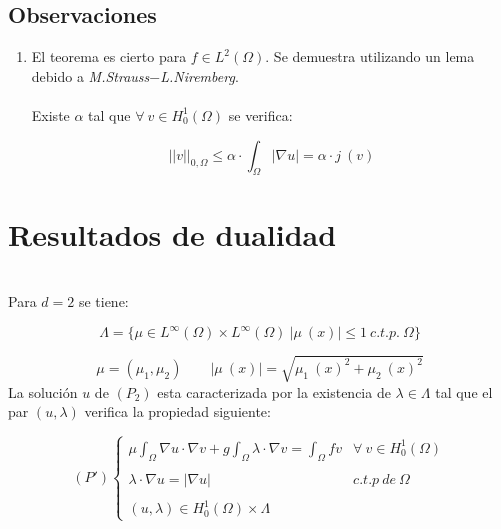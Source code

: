 \subsection{Observaciones}

\begin{enumerate}
\item El teorema es cierto para $f\in L^2(\Omega )$. Se demuestra utilizando un
lema debido a \emph{M.Strauss$-$L.Niremberg}.\\ \\
Existe $\alpha $ tal que $\forall \ v \in H^1_0(\Omega )$ se verifica:

\begin{displaymath}
||v||_{0,\Omega }\le \alpha \cdot \int_{\Omega } |\nabla u| = \alpha \cdot
j\ (v)
\end{displaymath}
\end{enumerate}

\newpage

\section{Resultados de dualidad}

\begin{teorema}
\ \\
Para $d=2$ se tiene:

\begin{displaymath}
\Lambda = \{\mu \in L^{\infty}(\Omega)\times L^{\infty}(\Omega )\ |\mu \ (x)|
\le 1\ c.t.p.\ \Omega \}
\end{displaymath}

\begin{displaymath}
\mu = (\mu_1,\mu_2)\qquad |\mu \ (x)| = \sqrt{\mu_1\ (x)^2+\mu_2\ (x)^2 }
\end{displaymath}
La soluci\'on $u$ de $(P_2)$ esta caracterizada por la existencia de
$\lambda \in \Lambda$ tal que el par $(u,\lambda )$ verifica la propiedad
siguiente:

\begin{displaymath}
(P') \left\{ \begin{array}{lr}
\mu \int_{\Omega } \nabla u \cdot \nabla v + g 
\int_{\Omega }  \lambda \cdot \nabla v = \int_{\Omega } fv & \forall \ v \in
H^1_0 (\Omega ) \\
\\
\lambda \cdot \nabla u = |\nabla u| & c.t.p \ de\ \Omega \\
\\
(u,\lambda) \in H^1_0 (\Omega )\times \Lambda
\end{array} \right.
\end{displaymath}

\end{teorema}

